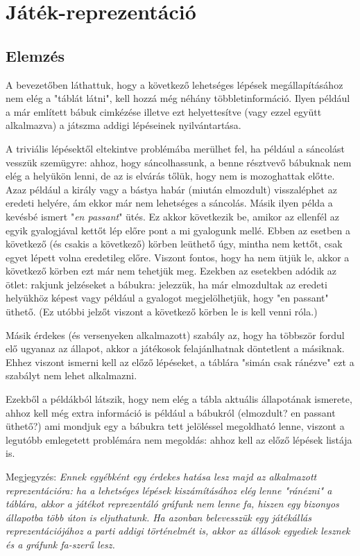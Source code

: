 \documentclass[twoside, a4paper, 12pt]{article}
\begin{document}
\newpage
\section{Játék-reprezentáció}
\subsection{Elemzés}
A bevezetőben láthattuk, hogy a következő lehetséges lépések megállapításához nem elég a "táblát látni", kell hozzá még néhány többletinformáció. Ilyen például a már említett bábuk cimkézése illetve ezt helyettesítve (vagy ezzel együtt alkalmazva) a játszma addigi lépéseinek nyilvántartása.

A triviális lépésektől eltekintve problémába merülhet fel, ha például a sáncolást vesszük szemügyre: ahhoz, hogy sáncolhassunk, a benne résztvevő bábuknak nem elég a helyükön lenni, de az is elvárás tőlük, hogy nem is mozoghattak előtte. Azaz például a király vagy a bástya habár (miután elmozdult) visszaléphet az eredeti helyére, ám ekkor már nem lehetséges a sáncolás. Másik ilyen példa a kevésbé ismert "\textit{en passant}" ütés. Ez akkor következik be, amikor az ellenfél az egyik gyalogjával kettőt lép előre pont a mi gyalogunk mellé. Ebben az esetben a következő (és csakis a következő) körben leüthető úgy, mintha nem kettőt, csak egyet lépett volna eredetileg előre. Viszont fontos, hogy ha nem ütjük le, akkor a következő körben ezt már nem tehetjük meg. Ezekben az esetekben adódik az ötlet: rakjunk jelzéseket a bábukra: jelezzük, ha már elmozdultak az eredeti helyükhöz képest vagy például a gyalogot megjelölhetjük, hogy "en passant" üthető. (Ez utóbbi jelzőt viszont a következő körben le is kell venni róla.)

Másik érdekes (és versenyeken alkalmazott) szabály az, hogy ha többször fordul elő ugyanaz az állapot, akkor a játékosok felajánlhatnak döntetlent a másiknak. Ehhez viszont ismerni kell az előző lépéseket, a táblára "simán csak ránézve" ezt a szabályt nem lehet alkalmazni.

Ezekből a példákból látszik, hogy nem elég a tábla aktuális állapotának ismerete, ahhoz kell még extra információ is például a bábukról (elmozdult? en passant üthető?) ami mondjuk egy a bábukra tett jelöléssel megoldható lenne, viszont a legutóbb emlegetett problémára nem megoldás: ahhoz kell az előző lépések listája is.

Megjegyzés: \textit{Ennek egyébként egy érdekes hatása lesz majd az alkalmazott reprezentációra: ha a lehetséges lépések kiszámításához elég lenne "ránézni" a táblára, akkor a játékot reprezentáló gráfunk nem lenne fa, hiszen egy bizonyos állapotba több úton is eljuthatunk. Ha azonban belevesszük egy játékállás reprezentációjához a parti addigi történelmét is, akkor az állások egyediek lesznek és a gráfunk fa-szerű lesz.}
\end{document}
